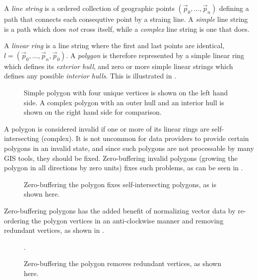 A \textit{line string} is a ordered collection of geographic points $(\vec{p}_0, ..., \vec{p}_n)$ defining a path that connects each consequtive point by a straing line.
A \textit{simple} line string is a path which does \textit{not} cross itself, while a \textit{complex} line string is one that does.

A \textit{linear ring} is a line string where the first and last points are identical, $l = (\vec{p}_0, ..., \vec{p}_n, \vec{p}_0)$.
A \textit{polygon} is therefore represented by a simple linear ring which defines its \textit{exterior hull}, and zero or more simple linear strings which defines any possible \textit{interior hulls}.
This is illustrated in .

\begin{figure}[htb]
  \centering
  
  \textcolor{gray}{\vrule}
  \hspace{0.01\linewidth}
  
  \caption{
    Simple polygon with four unique vertices is shown on the left hand side.
    A complex polygon with an outer hull
    and an interior hull is shown on the right hand side for comparison.
  }
  \label{fig:polygon-representation}
\end{figure}

A polygon is considered invalid if one or more of its linear rings are self-intersecting (complex).
It is not uncommon for data providers to provide certain polygons in an invalid state, and since such polygons are not processable by many GIS tools, they should be fixed.
Zero-buffering invalid polygons (growing the polygon in all directions by zero units) fixes such problems, as can be seen in .

\begin{figure}[H]
  \centering
  
  \caption{Zero-buffering the polygon fixes self-intersecting polygons, as is shown here.}
  \label{fig:complex-zero-buffer}
\end{figure}

Zero-buffering polygons has the added benefit of normalizing vector data by re-ordering the polygon vertices in an anti-clockwise manner and removing redundant vertices, as shown in .

\begin{figure}[H]
  \centering
  
  \caption{Zero-buffering the polygon removes redundant vertices, as shown here.}
  \label{fig:redundant-zero-buffer}.
\end{figure}

